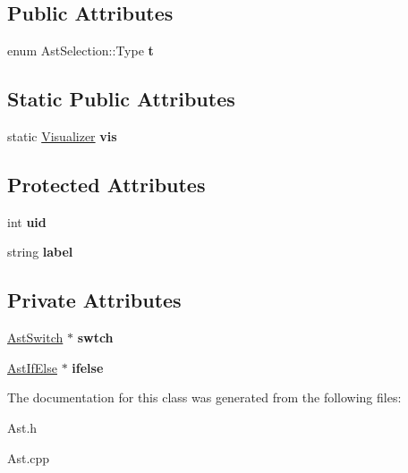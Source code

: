\subsection*{Public Attributes}
\begin{DoxyCompactItemize}
\item 
\hypertarget{classAstSelection_aea6ccdf9cb0336c1302cbac08e55ae8a}{enum Ast\-Selection\-::\-Type {\bfseries t}}\label{classAstSelection_aea6ccdf9cb0336c1302cbac08e55ae8a}

\end{DoxyCompactItemize}
\subsection*{Static Public Attributes}
\begin{DoxyCompactItemize}
\item 
\hypertarget{classAST_aca9e6637209b31e03a09c0d42f29bdfa}{static \hyperlink{classVisualizer}{Visualizer} {\bfseries vis}}\label{classAST_aca9e6637209b31e03a09c0d42f29bdfa}

\end{DoxyCompactItemize}
\subsection*{Protected Attributes}
\begin{DoxyCompactItemize}
\item 
\hypertarget{classAST_a847b778f1c3dd5a19de32de432ee6e15}{int {\bfseries uid}}\label{classAST_a847b778f1c3dd5a19de32de432ee6e15}

\item 
\hypertarget{classAST_ab2e239ccc0688d2341724432ff5a1a31}{string {\bfseries label}}\label{classAST_ab2e239ccc0688d2341724432ff5a1a31}

\end{DoxyCompactItemize}
\subsection*{Private Attributes}
\begin{DoxyCompactItemize}
\item 
\hypertarget{classAstSelection_a8addff87b6cee0d4e2ea69f68747269c}{\hyperlink{classAstSwitch}{Ast\-Switch} $\ast$ {\bfseries swtch}}\label{classAstSelection_a8addff87b6cee0d4e2ea69f68747269c}

\item 
\hypertarget{classAstSelection_a54be34f8f99d53fd3d04a3f7b545f039}{\hyperlink{classAstIfElse}{Ast\-If\-Else} $\ast$ {\bfseries ifelse}}\label{classAstSelection_a54be34f8f99d53fd3d04a3f7b545f039}

\end{DoxyCompactItemize}


The documentation for this class was generated from the following files\-:\begin{DoxyCompactItemize}
\item 
Ast.\-h\item 
Ast.\-cpp\end{DoxyCompactItemize}
